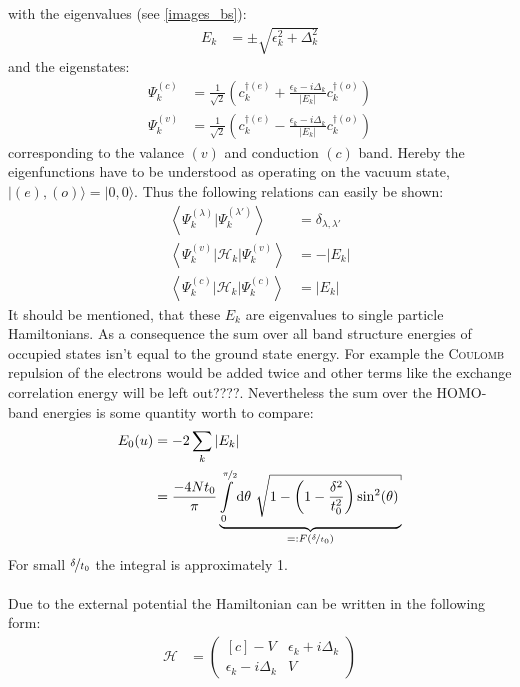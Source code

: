 with the eigenvalues (see \cref{images_bs}):
\begin{align}
	E_k &= \pm \sqrt{\epsilon_k^2+\Delta_k^2}
\end{align}
and the eigenstates:
\begin{align}
	\Psi_k^{(c)} &= \frac{1}{\sqrt{2}}\left(c_k^{\dagger(e)}+\frac{\epsilon_k - i \Delta_k}{|E_k|}c_{k}^{\dagger(o)}\right)\\
	\Psi_k^{(v)} &= \frac{1}{\sqrt{2}}\left(c_k^{\dagger(e)}-\frac{\epsilon_k - i \Delta_k}{|E_k|}c_{k}^{\dagger(o)}\right)
\end{align}
corresponding to the valance $(v)$ and conduction $(c)$ band. Hereby the eigenfunctions have to be understood as operating on the vacuum state, $|(e),(o)\rangle = |0,0\rangle$. Thus the following relations can easily be shown:
\begin{align}
	\left\langle\Psi_k^{(\lambda)}\Big|\Psi_k^{(\lambda\prime)}\right\rangle &= \delta_{\lambda,\lambda\prime}\\
	\left\langle\Psi_k^{(v)}\Big|\mathcal{H}_{k}\Big|\Psi_k^{(v)}\right\rangle &= - |E_k|\\
	\left\langle\Psi_k^{(c)}\Big|\mathcal{H}_{k}\Big|\Psi_k^{(c)}\right\rangle &= |E_k|
\end{align}
It should be mentioned, that these $E_k$ are eigenvalues to single particle Hamiltonians. As a consequence the sum over all band structure energies of occupied states isn't equal to the ground state energy. For example the \textsc{Coulomb} repulsion of the electrons would be added twice and other terms like the exchange correlation energy will be left out????. Nevertheless the sum over the HOMO-band energies is some quantity worth to compare:
\begin{align}
	E_0(u) &=-2\sum_k |E_k|\\
	&=\frac{-4Nt_0}{\pi}\underbrace{\int\limits_{0}^{\nicefrac{\pi}{2}}\text{d}\theta\ \sqrt{1-\left(1-\frac{\delta^2}{t_0^2}\right)\sin^2(\theta)}}_{=:F(\nicefrac{\delta}{t_0})}
\end{align}
For small $\nicefrac{\delta}{t_0}$ the integral is approximately 1.\\ \\
Due to the external potential the Hamiltonian can be written in the following form:
\begin{align}
	\mathcal{H} &= \begin{pmatrix*}[c]
	-V & \epsilon_k + i \Delta_k \\
	\epsilon_k - i \Delta_k & V
	\end{pmatrix*}
\end{align}
